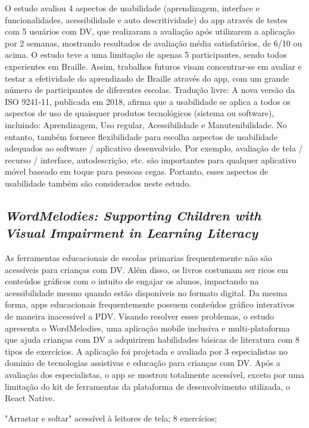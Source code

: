 O estudo avaliou 4 aspectos de usabilidade (aprendizagem, interface e funcionalidades, acessibilidade e auto descritividade) do app através de testes com 5 usuários com DV, que realizaram a avaliação após utilizarem a aplicação por 2 semanas, mostrando resultados de avaliação média satisfatórios, de 6/10 ou acima.
O estudo teve a uma limitação de apenas 5 participantes, sendo todos experientes em Braille.
Assim, trabalhos futuros visam concentrar-se em avaliar e testar a efetividade do aprendizado de Braille através do app, com um grande número de participantes de diferentes escolas.
Tradução livre: A nova versão da ISO 9241-11, publicada em 2018, afirma que a usabilidade se aplica a todos os aspectos de uso de quaisquer produtos tecnológicos (sistema ou software), incluindo: Aprendizagem, Uso regular, Acessibilidade e Manutenibilidade.
No entanto, também fornece flexibilidade para escolha aspectos de usabilidade adequados ao software / aplicativo desenvolvido.
Por exemplo, avaliação de tela / recurso / interface, autodescrição, etc.
são importantes para qualquer aplicativo móvel baseado em toque para pessoas cegas.
Portanto, esses aspectos de usabilidade também são considerados neste estudo.

\subsection{\emph{WordMelodies: Supporting Children with Visual Impairment in Learning Literacy}}

As ferramentas educacionais de escolas primarias frequentemente não são acessíveis para crianças com DV.
Além disso, os livros costumam ser ricos em conteúdos gráficos com o intuito de engajar os alunos, impactando na acessibilidade mesmo quando estão disponíveis no formato digital.
Da mesma forma, apps educacionais frequentemente possuem conteúdos gráfico interativos de maneira inacessível a PDV.
Visando resolver esses problemas, o estudo apresenta o WordMelodies, uma aplicação mobile inclusiva e multi-plataforma que ajuda crianças com DV a adquirirem habilidades básicas de literatura com 8 tipos de exercícios.
A aplicação foi projetada e avaliada por 3 especialistas no dominio de tecnologias assistivas e educação para crianças com DV.
Após a avaliação dos especialistas, o app se mostrou totalmente acessível, exceto por uma limitação do kit de ferramentas da plataforma de desenvolvimento utilizada, o React Native.

"Arrastar e soltar" acessível à leitores de tela;
8 exercícios;

